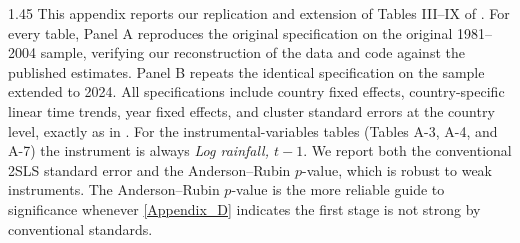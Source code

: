 \documentclass[12pt]{article}
\begin{document}
\begin{bibunit}[jpe]
\begin{spacing}{1.45}
This appendix reports our replication and extension of Tables III--IX of \citet{bruckner2011rain}. For every table, Panel A reproduces the original specification on the original 1981--2004 sample, verifying our reconstruction of the data and code against the published estimates. Panel B repeats the identical specification on the sample extended to 2024. All specifications include country fixed effects, country-specific linear time trends, year fixed effects, and cluster standard errors at the country level, exactly as in \citet{bruckner2011rain}. For the instrumental-variables tables (Tables A-3, A-4, and A-7) the instrument is always \textit{Log rainfall, $t-1$}. We report both the conventional 2SLS standard error and the Anderson--Rubin \citep{andersonrubin1949} $p$-value, which is robust to weak instruments. The Anderson--Rubin $p$-value is the more reliable guide to significance whenever \ref{Appendix_D} indicates the first stage is not strong by conventional standards.


\end{spacing}
\end{bibunit}
\end{document}
